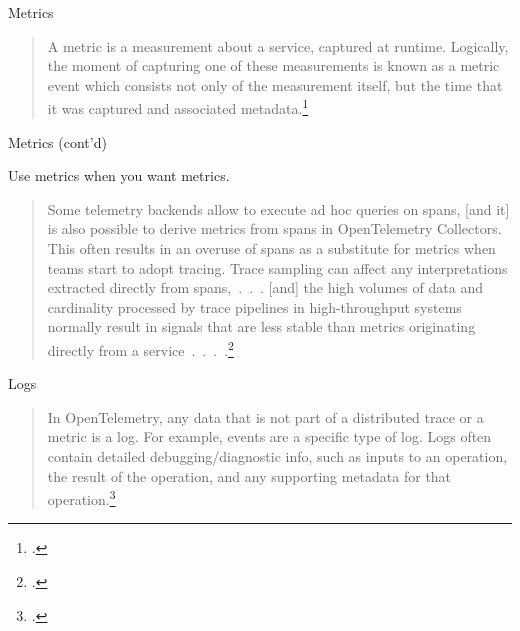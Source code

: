 \documentclass[aspectratio=169]{beamer}
\begin{document}
\begin{frame}{Metrics}

  \begin{quote}

    A metric is a measurement about a service, captured at runtime. Logically,
    the moment of capturing one of these measurements is known as a metric event
    which consists not only of the measurement itself, but the time that it was
    captured and associated metadata.\footcite{otel-metrics}

  \end{quote}
\end{frame}

\begin{frame}{Metrics (cont'd)}

  Use metrics when you want metrics.

  \vspace{1em}

  \begin{quote}

    Some telemetry backends allow to execute ad hoc queries on spans, [and it]
    is also possible to derive metrics from spans in OpenTelemetry Collectors.
      {\Large This often results in an overuse of spans as a substitute for
        metrics when teams start to adopt tracing.} Trace sampling can affect any
    interpretations extracted directly from spans,~.~.~. [and] the high volumes
    of data and cardinality processed by trace pipelines in high-throughput
    systems normally result in signals that are less stable than metrics
    originating directly from a service~.~.~.~.\footcite[ch.~6, emphasis
      added]{practical-otel}

  \end{quote}
\end{frame}

\begin{frame}{Logs}
  \begin{quote}

    In OpenTelemetry, any data that is not part of a distributed trace or a
    metric is a log. For example, events are a specific type of log. Logs often
    contain detailed debugging/diagnostic info, such as inputs to an operation,
    the result of the operation, and any supporting metadata for that
    operation.\footcite{otel-logs}

  \end{quote}
\end{frame}
\end{document}
